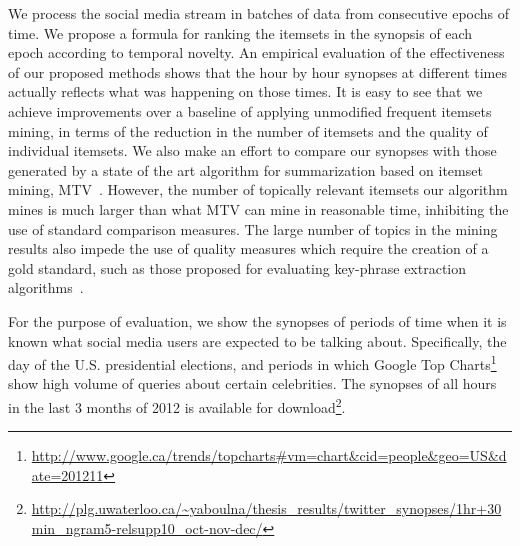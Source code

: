 \documentclass{sig-alternate}
\begin{document}
We process the social media stream in batches 
of data from consecutive epochs of time.
We propose a formula for ranking the itemsets
in the synopsis of each epoch according to temporal novelty.
An empirical evaluation of the effectiveness of our proposed methods
shows that the hour by hour synopses at different times %
actually reflects what was happening on those times. %
It is easy to see that
we achieve improvements over a baseline
of applying unmodified frequent itemsets mining, 
in terms of the reduction in the number of itemsets 
and the quality of individual itemsets.
We also make an effort to compare our synopses 
with those generated by a state of the art algorithm 
for summarization based on itemset mining, MTV~\cite{mampaey2011tell}.
However, the number of topically relevant itemsets our algorithm mines 
is much larger than what MTV can mine in reasonable time,
inhibiting the use of standard comparison measures.
The large number of topics in the mining results 
also impede the use of quality measures which require %
the creation of a gold standard, 
such as those proposed for evaluating
key-phrase extraction algorithms~\cite{Zhao:2011:TKE:2002472.2002521}.

For the purpose of evaluation, we show the synopses 
of periods of time when it is known what %
social media users are expected to be talking about.
Specifically, the day of the U.S. presidential elections,
and periods in which Google Top Charts\footnote{\scriptsize \url{http://www.google.ca/trends/topcharts\#vm=chart&cid=people&geo=US&date=201211}}
show high volume of queries about certain celebrities.
The synopses of all hours in the last 3 months of 2012
is available for download\footnote{\scriptsize \url{http://plg.uwaterloo.ca/~yaboulna/thesis_results/twitter_synopses/1hr+30min_ngram5-relsupp10_oct-nov-dec/}}. 

\end{document}

